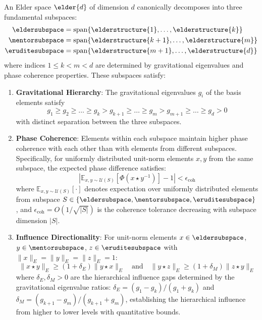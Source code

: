 \begin{definition}
\label{def:hierarchical_subspace_decomposition}
An Elder space $\elder{d}$ of dimension $d$ canonically decomposes into three fundamental subspaces:
\begin{align}
    \eldersubspace &= \mathrm{span}\{\elderstructure{1}, \ldots, \elderstructure{k}\} \\
    \mentorsubspace &= \mathrm{span}\{\elderstructure{k+1}, \ldots, \elderstructure{m}\} \\
    \eruditesubspace &= \mathrm{span}\{\elderstructure{m+1}, \ldots, \elderstructure{d}\}
\end{align}
where indices $1 \leq k < m < d$ are determined by gravitational eigenvalues and phase coherence properties. These subspaces satisfy:

\begin{enumerate}
    \item \textbf{Gravitational Hierarchy}: The gravitational eigenvalues $g_i$ of the basis elements satisfy
    \begin{equation}
    g_1 \geq g_2 \geq \ldots \geq g_k > g_{k+1} \geq \ldots \geq g_m > g_{m+1} \geq \ldots \geq g_d > 0
    \end{equation}
    with distinct separation between the three subspaces.
    
    \item \textbf{Phase Coherence}: Elements within each subspace maintain higher phase coherence with each other than with elements from different subspaces. Specifically, for uniformly distributed unit-norm elements $x, y$ from the same subspace, the expected phase difference satisfies:
    \begin{equation}
    \left|\mathbb{E}_{x,y \sim \mathcal{U}(S)}[\Phi(x \star y^{-1})] - 1\right| < \epsilon_{\text{coh}}
    \end{equation}
    where $\mathbb{E}_{x,y \sim \mathcal{U}(S)}[\cdot]$ denotes expectation over uniformly distributed elements from subspace $S \in \{\eldersubspace, \mentorsubspace, \eruditesubspace\}$, and $\epsilon_{\text{coh}} = O(1/\sqrt{|S|})$ is the coherence tolerance decreasing with subspace dimension $|S|$.
    
    \item \textbf{Influence Directionality}: For unit-norm elements $x \in \eldersubspace$, $y \in \mentorsubspace$, $z \in \eruditesubspace$ with $\|x\|_E = \|y\|_E = \|z\|_E = 1$:
    \begin{equation}
    \|x \star y\|_E \geq (1 + \delta_E) \|y \star x\|_E \quad \text{and} \quad \|y \star z\|_E \geq (1 + \delta_M) \|z \star y\|_E
    \end{equation}
    where $\delta_E, \delta_M > 0$ are the hierarchical influence gaps determined by the gravitational eigenvalue ratios: $\delta_E = (g_1 - g_k)/(g_1 + g_k)$ and $\delta_M = (g_{k+1} - g_m)/(g_{k+1} + g_m)$, establishing the hierarchical influence from higher to lower levels with quantitative bounds.
\end{enumerate}
\end{definition}

